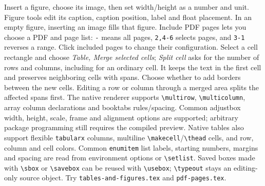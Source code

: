 \documentclass[11pt]{article}
\begin{document}
Insert a figure, choose its image, then set width/height as a number and unit.
Figure tools edit its caption, caption position, label and float placement. In an
empty figure, inserting an image fills that figure. Include PDF pages lets you
choose a PDF and page list: \verb|-| means all pages, \verb|2,4-6| selects pages,
and \verb|3-1| reverses a range. Click included pages to change their configuration.
Select a cell rectangle and choose \emph{Table, Merge selected cells};
\emph{Split cell} asks for the number of rows and columns, including for an
ordinary cell. It keeps the text in the first cell and preserves neighboring
cells with spans. Choose whether to add borders between the new cells.
Editing a row or column through a merged area splits the affected spans first.
The native renderer supports \verb|\multirow|, \verb|\multicolumn|,
array column declarations and booktabs rules/spacing. Common adjustbox width,
height, scale, frame and alignment options are supported; arbitrary package
programming still requires the compiled preview.
Native tables also support flexible \texttt{tabularx} columns, multiline
\verb|\makecell|/\verb|\thead| cells, and row, column and cell colors. Common
\texttt{enumitem} list labels, starting numbers, margins and spacing are read
from environment options or \verb|\setlist|. Saved boxes made with
\verb|\sbox| or \verb|\savebox| can be reused with \verb|\usebox|;
\verb|\typeout| stays an editing-only source object.
Try \texttt{tables-and-figures.tex} and \texttt{pdf-pages.tex}.
\end{document}
